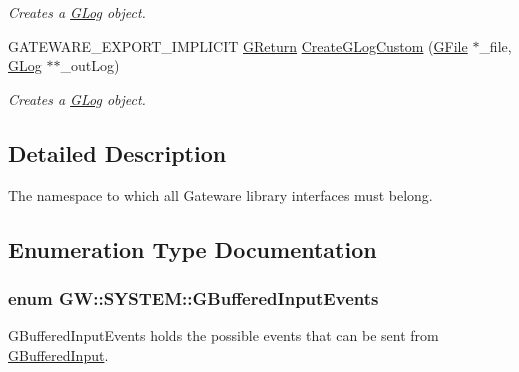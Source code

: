 \begin{DoxyCompactItemize}
\begin{DoxyCompactList}\small\item\em Creates a \hyperlink{classGW_1_1SYSTEM_1_1GLog}{G\+Log} object. \end{DoxyCompactList}\item 
G\+A\+T\+E\+W\+A\+R\+E\+\_\+\+E\+X\+P\+O\+R\+T\+\_\+\+I\+M\+P\+L\+I\+C\+IT \hyperlink{namespaceGW_a67a839e3df7ea8a5c5686613a7a3de21}{G\+Return} \hyperlink{namespaceGW_1_1SYSTEM_afe08ea421c9c918ea447ae47b9a631a9}{Create\+G\+Log\+Custom} (\hyperlink{classGW_1_1SYSTEM_1_1GFile}{G\+File} $\ast$\+\_\+file, \hyperlink{classGW_1_1SYSTEM_1_1GLog}{G\+Log} $\ast$$\ast$\+\_\+out\+Log)
\begin{DoxyCompactList}\small\item\em Creates a \hyperlink{classGW_1_1SYSTEM_1_1GLog}{G\+Log} object. \end{DoxyCompactList}\end{DoxyCompactItemize}


\subsection{Detailed Description}
The namespace to which all Gateware library interfaces must belong. 

\subsection{Enumeration Type Documentation}
\subsubsection[{\texorpdfstring{G\+Buffered\+Input\+Events}{GBufferedInputEvents}}]{\setlength{\rightskip}{0pt plus 5cm}enum {\bf G\+W\+::\+S\+Y\+S\+T\+E\+M\+::\+G\+Buffered\+Input\+Events}}\hypertarget{namespaceGW_1_1SYSTEM_a309fd3a92512dd2bfa8065d99c0d7fcb}{}\label{namespaceGW_1_1SYSTEM_a309fd3a92512dd2bfa8065d99c0d7fcb}


G\+Buffered\+Input\+Events holds the possible events that can be sent from \hyperlink{classGW_1_1SYSTEM_1_1GBufferedInput}{G\+Buffered\+Input}. 

